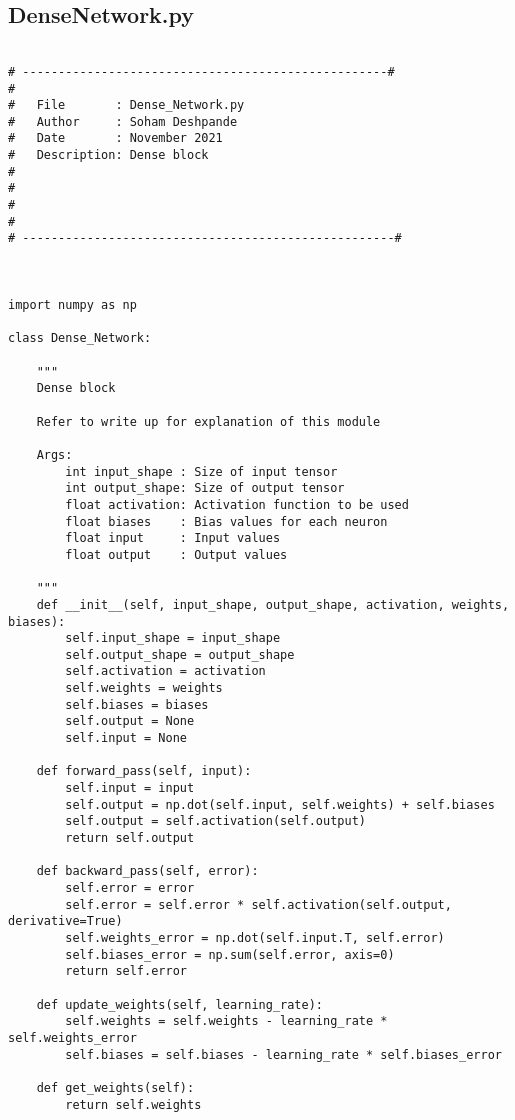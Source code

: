 \documentclass{article}
\begin{document}
\subsection{DenseNetwork.py}
\begin{lstlisting}

# ---------------------------------------------------#
#
#   File       : Dense_Network.py
#   Author     : Soham Deshpande
#   Date       : November 2021
#   Description: Dense block
#
#
#
#
# ----------------------------------------------------#



import numpy as np

class Dense_Network:

    """
    Dense block

    Refer to write up for explanation of this module

    Args:
        int input_shape : Size of input tensor
        int output_shape: Size of output tensor
        float activation: Activation function to be used
        float biases    : Bias values for each neuron
        float input     : Input values
        float output    : Output values

    """
    def __init__(self, input_shape, output_shape, activation, weights, biases):
        self.input_shape = input_shape
        self.output_shape = output_shape
        self.activation = activation
        self.weights = weights
        self.biases = biases
        self.output = None
        self.input = None

    def forward_pass(self, input):
        self.input = input
        self.output = np.dot(self.input, self.weights) + self.biases
        self.output = self.activation(self.output)
        return self.output

    def backward_pass(self, error):
        self.error = error
        self.error = self.error * self.activation(self.output, derivative=True)
        self.weights_error = np.dot(self.input.T, self.error)
        self.biases_error = np.sum(self.error, axis=0)
        return self.error

    def update_weights(self, learning_rate):
        self.weights = self.weights - learning_rate * self.weights_error
        self.biases = self.biases - learning_rate * self.biases_error

    def get_weights(self):
        return self.weights






\end{lstlisting}
\end{document}

